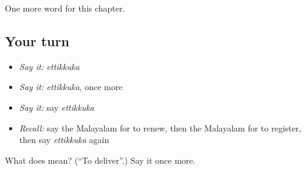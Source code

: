 \begin{grammarlens}[title={What you've built}]
One more word for this chapter.
\end{grammarlens}

\subsection*{Your turn}
\begin{itemize}
\raggedright
  \item \emph{Say it:} \emph{ettikkuka}
  \item \emph{Say it:} \emph{ettikkuka}, once more
  \item \emph{Say it:} say \emph{ettikkuka}
  \item \emph{Recall:} say the Malayalam for to renew, then the Malayalam for to register, then say \emph{ettikkuka} again
\end{itemize}

\begin{tcolorbox}[breakable,colback=teal!4,colframe=teal!35!black,title={Before you move on}]
What does  mean? (\textquotedblleft{}To deliver\textquotedblright{}.) Say it once more.
\end{tcolorbox}
